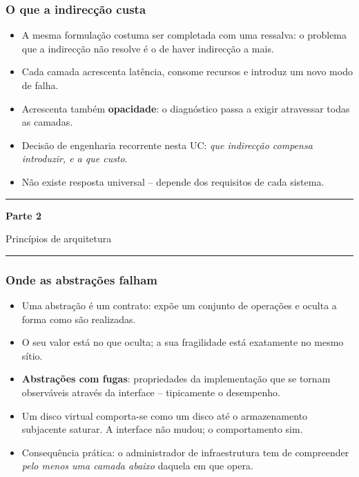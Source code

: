 \documentclass[aspectratio=169]{beamer}
\newcommand{\seccao}[2]{%
  \begin{frame}[plain]
    \vspace*{2.2cm}
    \begin{center}
      {\color{NudeTaupe}\rule{3cm}{0.5pt}}\par
      \vspace{0.6cm}
      {\Huge\bfseries\textcolor{TextEspresso}{#1}}\par
      \vspace{0.5cm}
      {\large\textcolor{NudeTaupe}{#2}}\par
      \vspace{0.6cm}
      {\color{NudeTaupe}\rule{3cm}{0.5pt}}
    \end{center}
  \end{frame}
}
\begin{document}
\begin{frame}
\frametitle{O que a indirecção custa}
\begin{itemize}
    \setlength\itemsep{0.35cm}
    \item A mesma formulação costuma ser completada com uma ressalva: o problema que a indirecção não resolve é o de haver indirecção a mais.
    \item Cada camada acrescenta latência, consome recursos e introduz um novo modo de falha.
    \item Acrescenta também \textbf{opacidade}: o diagnóstico passa a exigir atravessar todas as camadas.
    \item Decisão de engenharia recorrente nesta UC: \emph{que indirecção compensa introduzir, e a que custo}.
    \item Não existe resposta universal -- depende dos requisitos de cada sistema.
\end{itemize}
\end{frame}

\seccao{Parte 2}{Princípios de arquitetura}

\begin{frame}
\frametitle{Onde as abstrações falham}
\begin{itemize}
    \setlength\itemsep{0.35cm}
    \item Uma abstração é um contrato: expõe um conjunto de operações e oculta a forma como são realizadas.
    \item O seu valor está no que oculta; a sua fragilidade está exatamente no mesmo sítio.
    \item \textbf{Abstrações com fugas}: propriedades da implementação que se tornam observáveis através da interface -- tipicamente o desempenho.
    \item Um disco virtual comporta-se como um disco até o armazenamento subjacente saturar. A interface não mudou; o comportamento sim.
    \item Consequência prática: o administrador de infraestrutura tem de compreender \emph{pelo menos uma camada abaixo} daquela em que opera.
\end{itemize}
\end{frame}
\end{document}
